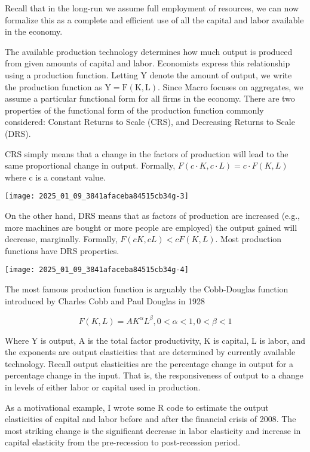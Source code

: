 \documentclass[10pt]{article}
\begin{document}
Recall that in the long-run we assume full employment of resources, we can now formalize this as a complete and efficient use of all the capital and labor available in the economy.

The available production technology determines how much output is produced from given amounts of capital and labor. Economists express this relationship using a production function. Letting Y denote the amount of output, we write the production function as $\mathrm{Y}=\mathrm{F}(\mathrm{K}, \mathrm{L})$. Since Macro focuses on aggregates, we assume a particular functional form for all firms in the economy. There are two properties of the functional form of the production function commonly considered: Constant Returns to Scale (CRS), and Decreasing Returns to Scale (DRS).

CRS simply means that a change in the factors of production will lead to the same proportional change in output. Formally, $F(c \cdot K, c \cdot L) = c \cdot F(K, L)$ where c is a constant value.

\texttt{[image: 2025\_01\_09\_3841afaceba84515cb34g-3]}

On the other hand, DRS means that as factors of production are increased (e.g., more machines are bought or more people are employed) the output gained will decrease, marginally. Formally, $F(c K, c L)<c F(K, L)$. Most production functions have DRS properties.

\texttt{[image: 2025\_01\_09\_3841afaceba84515cb34g-4]}

The most famous production function is arguably the Cobb-Douglas function introduced by Charles Cobb and Paul Douglas in 1928

$$F(K, L)=A K^{\alpha} L^{\beta}, 0<\alpha<1, 0<\beta<1$$

Where Y is output, A is the total factor productivity, K is capital, L is labor, and the exponents are output elasticities that are determined by currently available technology. Recall output elasticities are the percentage change in output for a percentage change in the input. That is, the responsiveness of output to a change in levels of either labor or capital used in production.

As a motivational example, I wrote some R code to estimate the output elasticities of capital and labor before and after the financial crisis of 2008. The most striking change is the significant decrease in labor elasticity and increase in capital elasticity from the pre-recession to post-recession period.
\end{document}

